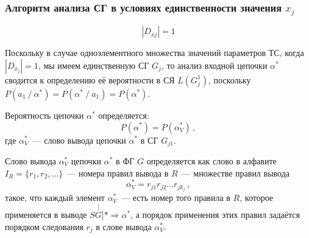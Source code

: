 
\subsubsection{Алгоритм анализа СГ в условиях единственности значения $x_j$}

\begin{equation*}
  |D_{xj}| = 1
\end{equation*}

Поскольку в случае одноэлементного множества значений параметров ТС,
когда $|D_{\bar{x}_j}| = 1$, мы имеем единственную СГ $G_j$, то
анализ входной цепочки $\alpha^*$ сводится к определению её
вероятности в СЯ $L(G_j^1)$, поскольку $P(a_1 \mathop{/} \alpha^*) =
P(\alpha^* \mathop{/} a_1) = P(\alpha^*)$.

Вероятность цепочки $\alpha^*$ определяется:
\begin{equation*}
  P(\alpha^*) = P(\alpha^*_V)\,,
\end{equation*}
где $\alpha_V^*$~--- слово вывода цепочки $\alpha^*$ в СГ $G_{j1}$.

\begin{rem}
  Слово вывода $\alpha_V^*$ цепочки $\alpha^*$ в ФГ $G$ определяется
  как слово в алфавите $I_R = \{r_1,r_2,\ldots\}$~--- номера правил
  вывода в $R$~--- множестве правил вывода
  \begin{equation*}
    \alpha_V^* = r_{j1}r_{j2}\ldots r_{jk_j}\,,
  \end{equation*}
  такое, что каждый элемент $\alpha_V^*$~--- есть номер того правила в
  $R$, которое применяется в выводе $S \stackrel[G]{*}{\Rightarrow}
  \alpha^*$, а порядок применения этих правил задаётся порядком
  следования $r_j$ в слове вывода $\alpha_V^*$.
\end{rem}

